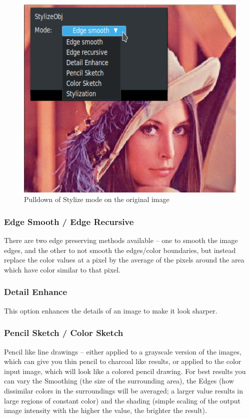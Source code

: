 \begin{figure}[htpb]
    \centering
    \includegraphics[width=0.8\linewidth]{images/stylizeobj01.png}
    \caption{Pulldown of Stylize mode on the original image}
    \label{fig:stylizeobj01}
\end{figure}

\subsubsection*{Edge Smooth / Edge Recursive}%
\label{ssub:edge_smooth_recursive}

There are two edge preserving methods available -- one to smooth the image edges, and the other to not smooth the edges/color boundaries, but instead replace the color values at a pixel by the average of the pixels around the area which have color similar to that pixel.

\subsubsection*{Detail Enhance}%
\label{ssub:detail_enhance}

This option enhances the details of an image to make it look sharper.

\subsubsection*{Pencil Sketch / Color Sketch}%
\label{ssub:pencil_color_sketch}

Pencil like line drawings -- either applied to a grayscale version of the images, which can give you thin pencil to charcoal like results, or applied to the color input image, which will look like a colored pencil drawing. For best results you can vary the Smoothing (the size of the surrounding area), the Edges (how dissimilar colors in the surroundings will be averaged; a larger value results in large regions of constant color) and the shading (simple scaling of the output image intensity with the higher the value, the brighter the result).

